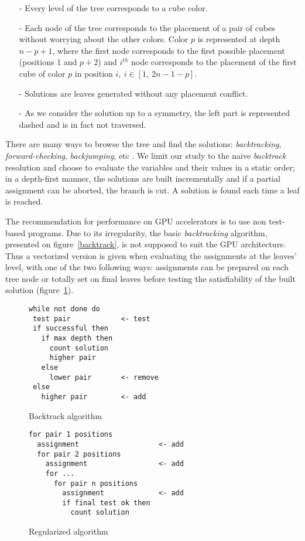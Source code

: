 \begin{itemize}   
\item[-] Every level of the tree corresponds to a cube color.
\item[-] Each node of the tree corresponds to the placement of a pair of cubes without worrying about the other colors. Color $p$ is represented at depth $n-p+1$, where the first node corresponds to the first possible placement (positions 1 and $p+2$) and $i^{th}$ node corresponds to the placement of the first cube of color $p$ in position $i, \ i \in [1, \ 2n-1-p]$.
\item[-] Solutions are leaves generated without any placement conflict.
\item[-] As we consider the solution up to a symmetry, the left part is represented dashed and is in fact not traversed.
\end{itemize}

There are many ways to browse the tree and find the solutions: \emph{backtracking}, \emph{forward-checking}, \emph{backjumping}, etc \cite{prosser93hybrid}. 
We limit our study to the naive \emph{backtrack} resolution and choose to evaluate the variables and their values in a static order; in a depth-first manner, the solutions are built incrementally and if a partial assignment can be aborted, the branch is cut. A solution is found each time a leaf is reached.

The recommendation for performance on GPU accelerators is to use non test-based programs.
Due to its irregularity, the basic \emph{backtracking} algorithm, presented on figure~\ref{backtrack}, is not supposed to suit the GPU architecture.
Thus a vectorized version is given when evaluating the assignments at the leaves' level, with one of the two following ways: assignments can be prepared on each tree node or totally set on final leaves before testing the satisfiability of the built solution (figure~\ref{regularized}).

\begin{figure}[t!]
\begin{minipage}[b]{0.45\linewidth}
\footnotesize
\begin{verbatim}
while not done do
 test pair            <- test
 if successful then 
   if max depth then
     count solution
     higher pair	                  
   else
     lower pair       <- remove
 else
   higher pair        <- add
\end{verbatim}
\caption{Backtrack algorithm}\label{backtrack}
\end{minipage}
\begin{minipage}[b]{0.45\linewidth}
\footnotesize
\begin{verbatim}
for pair 1 positions
  assignment                   <- add
  for pair 2 positions
    assignment                 <- add
    for ...
      for pair n positions
        assignment             <- add
        if final test ok then  
          count solution
\end{verbatim}
\caption{Regularized algorithm}\label{regularized}
\end{minipage}
\end{figure}

